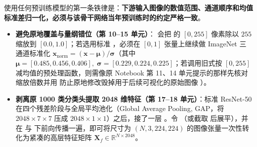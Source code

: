 使用任何预训练模型的第一条铁律是：\textbf{下游输入图像的数值范围、通道顺序和均值标准差归一化，必须与该骨干网络当年预训练时的约定严格一致}。
\begin{itemize}
\item \textbf{避免原地覆盖与量纲错位（第 10–15 单元）}： 会把  的 $[0, 255]$ 像素除以 $255$ 缩放到 $[0.0, 1.0]$；若选用标准 ，必须在 $[0, 1]$ 张量上继续做 ImageNet 三通道标准化 $\mathbf{x}_{\mathrm{norm}} = (\mathbf{x} - \boldsymbol{\mu}) / \boldsymbol{\sigma}$（其中 $\boldsymbol{\mu} = [0.485, 0.456, 0.406],\; \boldsymbol{\sigma} = [0.229, 0.224, 0.225]$；若调用旧式按 $[0,255]$ 减均值的预处理函数，则需像原 Notebook 第 11、14 单元提示的那样先核对缩放倍数并用  防止原地修改毁掉用于后续可视化的原始图像 ）。
\item \textbf{剥离原 1000 类分类头提取 2048 维特征（第 17–18 单元）}：标准 ResNet-50 在四个残差阶段与全局平均池化（Global Average Pooling, GAP，将 $2048\times 7\times 7$ 压成 $2048\times 1\times 1$）之后，接了一层 。令 （或截取  后展平），并在  与  下前向传播一遍，即可将尺寸为 $(N, 3, 224, 224)$ 的图像张量一次性转化为紧凑的高层特征矩阵 $\mathbf{X}_f \in \mathbb{R}^{N \times 2048}$。
\end{itemize}



